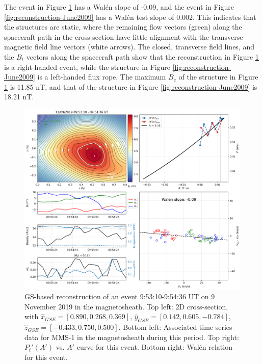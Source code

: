 The event in Figure \ref{fig:reconstruction-Nov2019} has a Wal\'en slope of -0.09, and the event in Figure \ref{fig:reconstruction-June2009} has a Wal\'en test slope of 0.002. This indicates that the structures are static, where the remaining flow vectors (green) along the spacecraft path in the cross-section have little alignment with the transverse magnetic field line vectors (white arrows). The closed, transverse field lines, and the $B_t$ vectors along the spacecraft path show that the reconstruction in Figure \ref{fig:reconstruction-Nov2019} is a right-handed event, while the structure in Figure \ref{fig:reconstruction-June2009} is a left-handed flux rope. The maximum $B_z$ of the structure in Figure \ref{fig:reconstruction-Nov2019} is 11.85 nT, and that of the structure in Figure \ref{fig:reconstruction-June2009} is 18.21 nT.

\begin{figure}
    \centering
    \includegraphics[width=\textwidth]{Figures/Reconstructions/timeseries_walenTest_20191109_20191110.png}
    \caption[GS-based event reconstruction for 9 November 2019]{GS-based reconstruction of an event 9:53:10-9:54:36 UT on 9 November 2019 in the magnetosheath. Top left: 2D cross-section, with $\hat{x}_{GSE}=[0.890, 0.268, 0.369]$, $\hat{y}_{GSE}=[0.142, 0.605, -0.784]$, $\hat{z}_{GSE}=[-0.433, 0.750, 0.500]$. Bottom left: Associated time series data for MMS-1 in the magnetosheath during this period. Top right: $P_t'(A')$ vs. $A'$ curve for this event. Bottom right: Wal\'en relation for this event.}
    \label{fig:reconstruction-Nov2019}
\end{figure}

